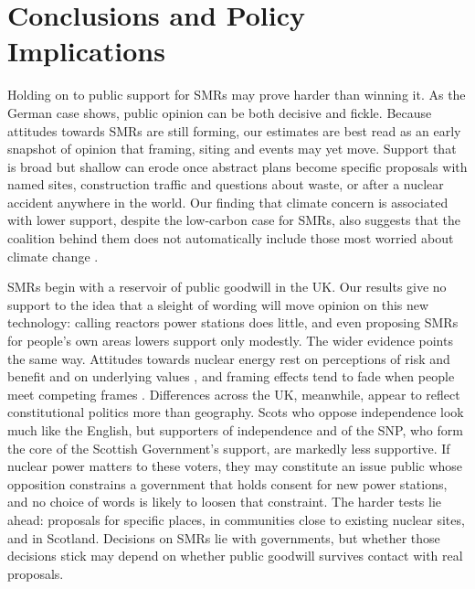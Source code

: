 \documentclass[a4paper, 11pt]{article}
\begin{document}
\section{Conclusions and Policy Implications}
Holding on to public support for SMRs may prove harder than winning it. As the German case shows, public opinion can be both decisive and fickle. Because attitudes towards SMRs are still forming, our estimates are best read as an early snapshot of opinion that framing, siting and events may yet move. Support that is broad but shallow can erode once abstract plans become specific proposals with named sites, construction traffic and questions about waste, or after a nuclear accident anywhere in the world. Our finding that climate concern is associated with lower support, despite the low-carbon case for SMRs, also suggests that the coalition behind them does not automatically include those most worried about climate change \citep{corner2011,sonnberger2021}.

SMRs begin with a reservoir of public goodwill in the UK. Our results give no support to the idea that a sleight of wording will move opinion on this new technology: calling reactors power stations does little, and even proposing SMRs for people's own areas lowers support only modestly. The wider evidence points the same way. Attitudes towards nuclear energy rest on perceptions of risk and benefit and on underlying values \citep{aina_poy2026,degroot2013}, and framing effects tend to fade when people meet competing frames \citep{chong2007}. Differences across the UK, meanwhile, appear to reflect constitutional politics more than geography. Scots who oppose independence look much like the English, but supporters of independence and of the SNP, who form the core of the Scottish Government's support, are markedly less supportive. If nuclear power matters to these voters, they may constitute an issue public \citep{krosnick1990} whose opposition constrains a government that holds consent for new power stations, and no choice of words is likely to loosen that constraint. The harder tests lie ahead: proposals for specific places, in communities close to existing nuclear sites, and in Scotland. Decisions on SMRs lie with governments, but whether those decisions stick may depend on whether public goodwill survives contact with real proposals.

\singlespacing


  \setlength{\bibsep}{0.5em}

\end{document}
